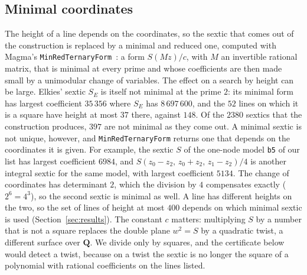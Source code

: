 \documentclass[11pt]{article}
\newcommand{\Q}{\mathbf{Q}}
\theoremstyle{remark}
\begin{document}
\subsection*{Minimal coordinates}
The height of a line depends on the coordinates, so the sextic that comes out of the construction is replaced by a minimal and
reduced one, computed with Magma's \texttt{MinRedTernaryForm}~\cite{ElsenhansStoll}: a form $S(Mz)/c$, with $M$ an invertible
rational matrix, that is minimal at every prime and whose coefficients are then made small by a unimodular change of variables.
The effect on a search by height can be large.  Elkies' sextic $S_E$ is itself not minimal at the prime $2$: its minimal form has
largest coefficient $35\,356$ where $S_E$ has $8\,697\,600$, and the $52$ lines on which it is a square have height at most $37$
there, against $148$.  Of the $2380$ sextics that the construction produces, $397$ are not minimal as they come out.
A minimal sextic is not unique, however, and \texttt{MinRedTernaryForm} returns one that depends on the coordinates it is given.
For example, the sextic $S$ of the one-node model \texttt{b5} of our list has largest coefficient $6984$, and
$S(z_0-z_2,\,z_0+z_2,\,z_1-z_2)/4$ is another integral sextic for the same model, with largest coefficient $5134$.  The
change of coordinates has determinant $2$, which the division by $4$ compensates exactly ($2^6=4^3$), so the second sextic is
minimal as well.  A line has different heights on the two, so the set of lines of height at most $400$
depends on which minimal sextic is used (Section~\ref{sec:results}).  The constant $c$ matters: multiplying $S$ by a
number that is not a square replaces the double plane $w^2=S$ by a quadratic twist, a different surface over $\Q$.  We divide
only by squares, and the certificate below would detect a twist, because on a twist the sextic is no longer the square of a
polynomial with rational coefficients on the lines listed.
\end{document}
